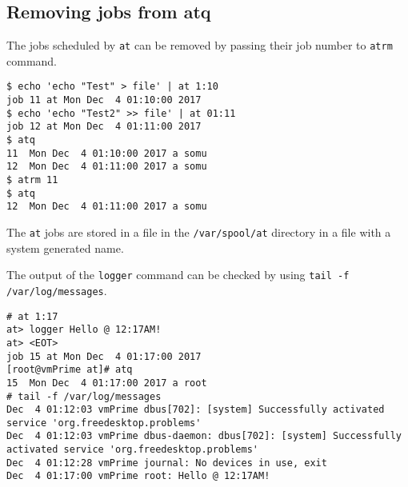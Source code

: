 \subsection{Removing jobs from atq}
The jobs scheduled by \verb|at| can be removed by passing their job number to \verb|atrm| command. 

\vspace{-15pt}
\begin{verbatim}
$ echo 'echo "Test" > file' | at 1:10
job 11 at Mon Dec  4 01:10:00 2017
$ echo 'echo "Test2" >> file' | at 01:11
job 12 at Mon Dec  4 01:11:00 2017
$ atq
11	Mon Dec  4 01:10:00 2017 a somu
12	Mon Dec  4 01:11:00 2017 a somu
$ atrm 11
$ atq
12	Mon Dec  4 01:11:00 2017 a somu
\end{verbatim}
\vspace{-10pt}

\noindent
The \verb|at| jobs are stored in a file in the \verb|/var/spool/at| directory in a file with a system generated name. 

The output of the \verb|logger| command can be checked by using \verb|tail -f /var/log/messages|.

\vspace{-15pt}
\begin{verbatim}
# at 1:17
at> logger Hello @ 12:17AM!
at> <EOT>
job 15 at Mon Dec  4 01:17:00 2017
[root@vmPrime at]# atq
15	Mon Dec  4 01:17:00 2017 a root
# tail -f /var/log/messages
Dec  4 01:12:03 vmPrime dbus[702]: [system] Successfully activated service 'org.freedesktop.problems'
Dec  4 01:12:03 vmPrime dbus-daemon: dbus[702]: [system] Successfully activated service 'org.freedesktop.problems'
Dec  4 01:12:28 vmPrime journal: No devices in use, exit
Dec  4 01:17:00 vmPrime root: Hello @ 12:17AM!
\end{verbatim}
\vspace{-10pt}